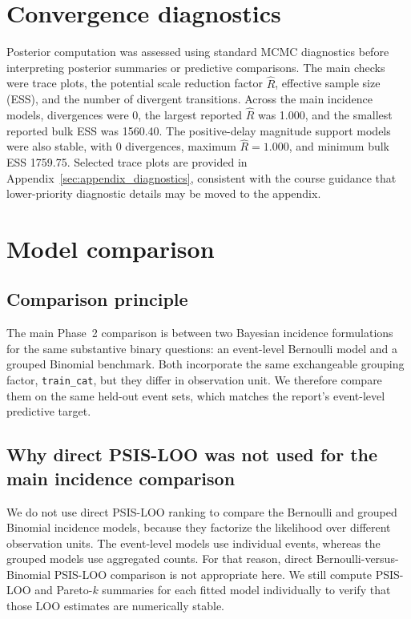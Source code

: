 \documentclass[12pt]{article}
\begin{document}
\section{Convergence diagnostics}

Posterior computation was assessed using standard MCMC diagnostics before interpreting posterior summaries or predictive comparisons. The main checks were trace plots, the potential scale reduction factor \(\hat{R}\), effective sample size (ESS), and the number of divergent transitions. Across the main incidence models, divergences were 0, the largest reported \(\hat{R}\) was 1.000, and the smallest reported bulk ESS was 1560.40. The positive-delay magnitude support models were also stable, with 0 divergences, maximum \(\hat{R}=1.000\), and minimum bulk ESS 1759.75. Selected trace plots are provided in Appendix~\ref{sec:appendix_diagnostics}, consistent with the course guidance that lower-priority diagnostic details may be moved to the appendix.

\section{Model comparison}

\subsection{Comparison principle}

The main Phase~2 comparison is between two Bayesian incidence formulations for the same substantive binary questions: an event-level Bernoulli model and a grouped Binomial benchmark. Both incorporate the same exchangeable grouping factor, \texttt{train\_cat}, but they differ in observation unit. We therefore compare them on the same held-out event sets, which matches the report's event-level predictive target.

\subsection{Why direct PSIS-LOO was not used for the main incidence comparison}

We do not use direct PSIS-LOO ranking to compare the Bernoulli and grouped Binomial incidence models, because they factorize the likelihood over different observation units. The event-level models use individual events, whereas the grouped models use aggregated counts. For that reason, direct Bernoulli-versus-Binomial PSIS-LOO comparison is not appropriate here. We still compute PSIS-LOO and Pareto-\(k\) summaries for each fitted model individually to verify that those LOO estimates are numerically stable.
\end{document}

